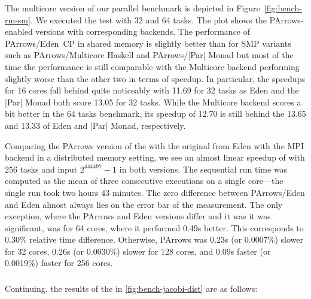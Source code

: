 The multicore version of our parallel \rmtest benchmark is depicted in
Figure~\ref{fig:bench-rm-sm}. We executed the test with 32 and 64
tasks. The plot shows the PArrows-enabled versions with corresponding backends.
The performance of PArrows/Eden~CP in shared memory is slightly better than
for SMP variants such as PArrows/Multicore Haskell and PArrows/|Par|
Monad but most of the time the performance is still comparable with the Multicore backend performing slightly worse than the other two in terms of speedup. In particular, the speedups for 16 cores fall behind quite noticeably with 11.69 for 32 tasks as Eden and the |Par| Monad both score 13.05 for 32 tasks. While the Multicore backend scores a bit better in the 64 tasks benchmark, its speedup of 12.70 is still behind the 13.65 and 13.33 of Eden and |Par| Monad, respectively.

Comparing the PArrows version of the \rmtest with the original from Eden with the MPI backend in a distributed memory setting, we see an almost linear speedup of
\rmtest with 256 tasks and input $2^{444497}-1$ in both versions. The sequential run time
was computed as the mean of three consecutive executions on a single
core---the single run took two hours 43 minutes. The zero difference  between
PArrows/Eden and Eden almost always lies on the error bar of
the measurement. The only exception, where the PArrows and Eden versions differ and it was it was significant, was for 64 cores, where it performed 0.49s better. This corresponds to
0.30\% relative time difference. Otherwise, PArrows was 0.23s (or 0.0007\%) slower for 32 cores, 0.26s (or 0.0030\%) slower for 128 cores, and 0.09s faster (or 0.0019\%) faster for 256 cores.


\subsubsection{\jacobitest}

Continuing, the results of the \jacobitest in \ref{fig:bench-jacobi-dist} are as follows:

